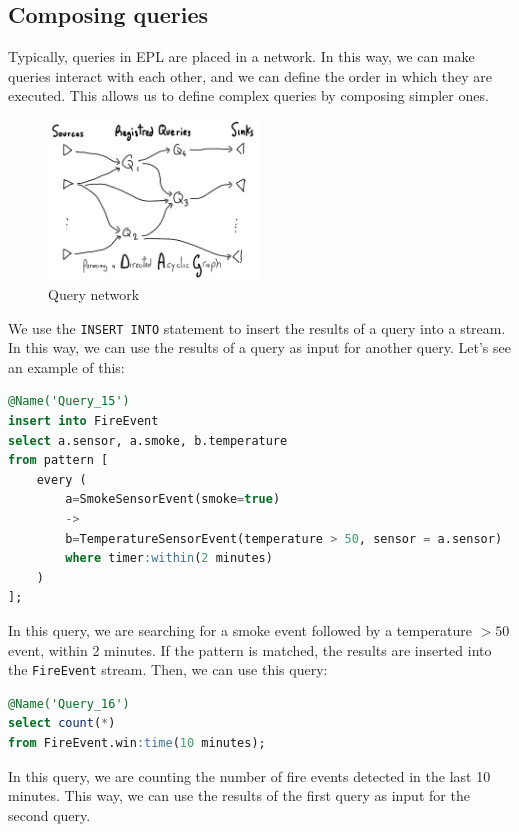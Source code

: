 \subsection{Composing queries}

Typically, queries in EPL are placed in a network. In this way, we can make 
queries interact with each other, and we can define the order in which they are
executed. This allows us to define complex queries by composing simpler ones.\\

\begin{figure}[H]
    \centering
    \includegraphics[width=0.5\textwidth]{figures/image_composite_queries.png}
    \caption{Query network}
    \label{fig:query_network}
\end{figure}

We use the \texttt{INSERT INTO} statement to insert the results of a query
into a stream. In this way, we can use the results of a query as input for
another query. Let's see an example of this:\\

\begin{lstlisting}[language=SQL]
@Name('Query_15')
insert into FireEvent
select a.sensor, a.smoke, b.temperature
from pattern [
    every (
        a=SmokeSensorEvent(smoke=true) 
        ->
        b=TemperatureSensorEvent(temperature > 50, sensor = a.sensor)
        where timer:within(2 minutes)
    )
];
\end{lstlisting}

In this query, we are searching for a smoke event followed by a temperature $> 50$
event, within 2 minutes. If the pattern is matched, the results are inserted into
the \texttt{FireEvent} stream. Then, we can use this query:\\

\begin{lstlisting}[language=SQL]
@Name('Query_16')
select count(*)
from FireEvent.win:time(10 minutes);
\end{lstlisting}

In this query, we are counting the number of fire events detected in the last
10 minutes. This way, we can use the results of the first query as input for the
second query.
